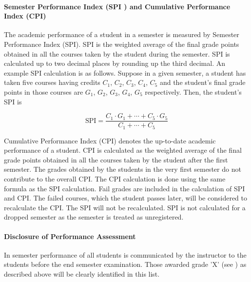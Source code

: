 \paragraph{Semester Performance Index (SPI \label{lab:SPI}) and Cumulative Performance Index (CPI) \label{lab:SPICPI}} The academic performance of a \gls{student} in a semester is measured by Semester Performance Index (SPI). SPI is the weighted average of the final grade points obtained in all the courses taken by the \gls{student} during the semester. SPI is calculated up to two decimal places by rounding up the third decimal. An example SPI calculation is as follows. Suppose in a given semester, a \gls{student} has taken five courses having credits $C_1$, $C_2$, $C_3$, $C_4$, $C_5$ and the \gls{student}’s final grade points in those courses are $G_1$, $G_2$, $G_3$, $G_4$, $G_5$ respectively. Then, the student’s SPI is

\begin{equation}
    \mathrm{SPI}=\frac{C_1\cdot G_1+ \cdots + C_5 \cdot G_5}{C_1+ \cdots +C_5}
    \label{SPI Calculation}
\end{equation}

Cumulative Performance Index (CPI) \label{lab:CPI} denotes the up-to-date academic performance of a \gls{student}. CPI is calculated as the weighted average of the final grade points obtained in all the courses taken by the \gls{student} after the first semester. The grades obtained by the \glspl{student} in the very first semester do not contribute to the overall CPI. The CPI calculation is done using the same formula as the SPI calculation. Fail grades are included in the calculation of SPI and CPI. The failed courses, which the \gls{student} passes later, will be considered to recalculate the CPI. The SPI will not be recalculated. SPI is not calculated for a dropped semester as the semester is treated as unregistered. 

\paragraph{Disclosure of Performance Assessment} In semester performance of all \glspl{student} is communicated by the instructor to the \glspl{student} before the end semester examination. Those awarded grade 'X' (see ) as described above will be clearly identified in this list.

